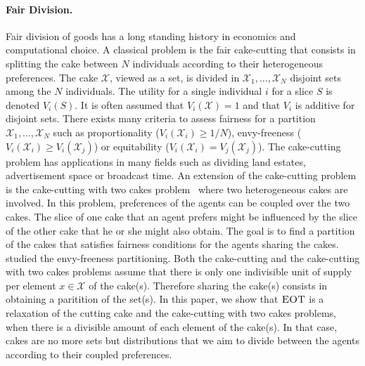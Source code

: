 \paragraph{Fair Division.} Fair division of goods has a long standing history in economics and computational choice. A classical problem is the fair cake-cutting that consists in splitting the cake between $N$ individuals according to their heterogeneous preferences. The cake $\mathcal{X}$, viewed as a set, is divided in $\mathcal{X}_1,\dots,\mathcal{X}_N$ disjoint sets among the $N$ individuals. The utility for a single individual $i$ for a slice $S$ is denoted $V_i(S)$. It is often assumed that $V_i(\mathcal{X}) = 1$ and that $V_i$ is additive for disjoint sets. There exists many criteria to assess fairness for a partition $\mathcal{X}_1,\dots,\mathcal{X}_N$ such as proportionality ($V_i(\mathcal{X}_i)\geq 1/N$), envy-freeness ($V_i(\mathcal{X}_i)\geq V_i(\mathcal{X}_j)$) or equitability ($V_i(\mathcal{X}_i)= V_j(\mathcal{X}_j)$).
The cake-cutting problem has applications in many fields such as dividing land estates, advertisement space or broadcast time. An extension of the cake-cutting problem is the cake-cutting with two cakes problem~\citep{cloutier2010two} where two heterogeneous cakes are involved. In this problem, preferences of the agents can be coupled over the two cakes. The slice of one cake that an agent prefers might be influenced by the slice of the other cake that he or she might also obtain. The goal is to find a partition of the cakes that satisfies fairness conditions for the agents sharing the cakes.~\citet{cloutier2010two} studied the envy-freeness partitioning. Both the cake-cutting and the cake-cutting with two cakes problems assume that there is only one indivisible unit of supply per element $x\in\mathcal{X}$ of the cake(s). Therefore sharing the cake(s) consists in obtaining a paritition of the set(s). In this paper, we show that $\textsc{EOT}$ is a relaxation of the cutting cake and the cake-cutting with two cakes problems, when there is a divisible amount of each element of the cake(s). In that case, cakes are no more sets but distributions that we aim to divide between the agents according to their coupled preferences.






